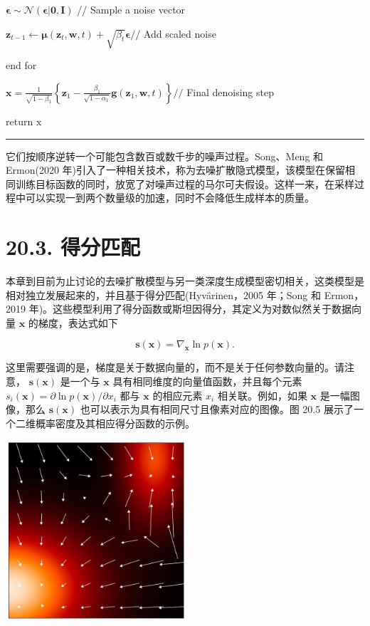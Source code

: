 \documentclass[10pt]{report}
\newcommand{\HRule}{\begin{center}\rule{0.9\linewidth}{0.2mm}\end{center}}
\begin{document}
\hspace*{1em} \(\mathbf{\epsilon } \sim  \mathcal{N}\left( {\mathbf{\epsilon }|\mathbf{0},\mathbf{I}}\right)\) // Sample a noise vector

\hspace*{1em} \({\mathbf{z}}_{t - 1} \leftarrow  \mathbf{\mu }\left( {{\mathbf{z}}_{t},\mathbf{w},t}\right)  + \sqrt{{\beta }_{t}}\mathbf{\epsilon }//\) Add scaled noise

end for

\(\mathbf{x} = \frac{1}{\sqrt{1 - {\beta }_{1}}}\left\{  {{\mathbf{z}}_{1} - \frac{{\beta }_{1}}{\sqrt{1 - {\alpha }_{1}}}\mathbf{g}\left( {{\mathbf{z}}_{1},\mathbf{w},t}\right) }\right\}  //\) Final denoising step

return \(\mathrm{x}\)

\HRule

它们按顺序逆转一个可能包含数百或数千步的噪声过程。Song、Meng 和 Ermon(2020 年)引入了一种相关技术，称为去噪扩散隐式模型，该模型在保留相同训练目标函数的同时，放宽了对噪声过程的马尔可夫假设。这样一来，在采样过程中可以实现一到两个数量级的加速，同时不会降低生成样本的质量。

\section*{20.3. 得分匹配}

本章到目前为止讨论的去噪扩散模型与另一类深度生成模型密切相关，这类模型是相对独立发展起来的，并且基于得分匹配(Hyvärinen，2005 年；Song 和 Ermon，2019 年)。这些模型利用了得分函数或斯坦因得分，其定义为对数似然关于数据向量 \(\mathbf{x}\) 的梯度，表达式如下

\[
\mathbf{s}\left( \mathbf{x}\right)  = {\nabla }_{\mathbf{x}}\ln p\left( \mathbf{x}\right) . \tag{20.42}
\]

这里需要强调的是，梯度是关于数据向量的，而不是关于任何参数向量的。请注意， \(\mathbf{s}\left( \mathbf{x}\right)\) 是一个与 \(\mathbf{x}\) 具有相同维度的向量值函数，并且每个元素 \({s}_{i}\left( \mathbf{x}\right)  = \partial \ln p\left( \mathbf{x}\right) /\partial {x}_{i}\) 都与 \(\mathbf{x}\) 的相应元素 \({x}_{i}\) 相关联。例如，如果 \(\mathbf{x}\) 是一幅图像，那么 \(\mathbf{s}\left( \mathbf{x}\right)\) 也可以表示为具有相同尺寸且像素对应的图像。图 20.5 展示了一个二维概率密度及其相应得分函数的示例。

\begin{center}
\includegraphics[max width=0.5\textwidth]{images/0194e279-9b28-703a-88f4-c3ac21e2010d_614_910_349_624_626_0.jpg}
\end{center}
\hspace*{3em} 
\end{document}
